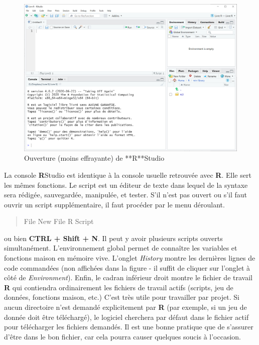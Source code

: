 \documentclass[
]{book}
\begin{document}
\begin{figure}

{\centering \includegraphics[width=0.75\linewidth]{image//ConsoleRStudio} 

}

\caption{Ouverture (moins effrayante) de **R**Studio}\label{fig:ConsoleRStudio}
\end{figure}

La console \textbf{R}Studio est identique à la console usuelle retrouvée avec \textbf{R}. Elle sert les mêmes fonctions. Le script est un éditeur de texte dans lequel de la syntaxe sera rédigée, sauvegardée, manipulée, et tester. S'il n'est pas ouvert ou s'il faut ouvrir un script supplémentaire, il faut procéder par le menu déroulant.

\begin{quote}
File
New File
R Script
\end{quote}

ou bien \textbf{CTRL + Shift + N}. Il peut y avoir plusieurs scripts ouverts simultanément. L'environnement global permet de connaître les variables et fonctions maison en mémoire vive. L'onglet \emph{History} montre les dernières lignes de code commandées (non affichées dans la figure - il suffit de cliquer sur l'onglet à côté de \emph{Environment}). Enfin, le cadran inférieur droit montre le fichier de travail \textbf{R} qui contiendra ordinairement les fichiers de travail actifs (scripts, jeu de données, fonctions maison, etc.) C'est très utile pour travailler par projet. Si aucun directoire n'est demandé explicitement par \textbf{R} (par exemple, si un jeu de donnée doit être téléchargé), le logiciel cherchera par défaut dans le fichier actif pour télécharger les fichiers demandés. Il est une bonne pratique que de s'assurer d'être dans le bon fichier, car cela pourra causer quelques soucis à l'occasion.
\end{document}
